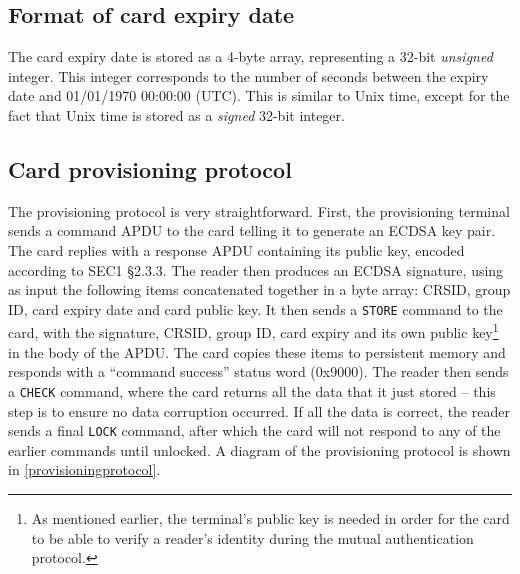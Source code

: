 \documentclass[12pt,a4paper,twoside,openright]{report}
\begin{document}
\subsection{Format of card expiry date}

The card expiry date is stored as a 4-byte array, representing a 32-bit \emph{unsigned} integer. This integer corresponds to the number of seconds between the expiry date and 01/01/1970 00:00:00 (UTC). This is similar to Unix time, except for the fact that Unix time is stored as a \emph{signed} 32-bit integer.

\subsection{Card provisioning protocol}

The provisioning protocol is very straightforward. First, the provisioning terminal sends a command APDU to the card telling it to generate an ECDSA key pair. The card replies with a response APDU containing its public key, encoded according to SEC1 \cite{sec1} \S2.3.3. The reader then produces an ECDSA signature, using as input the following items concatenated together in a byte array: CRSID, group ID, card expiry date and card public key. It then sends a \texttt{STORE} command to the card, with the signature, CRSID, group ID, card expiry and its own public key\footnote{As mentioned earlier, the terminal's public key is needed in order for the card to be able to verify a reader's identity during the mutual authentication protocol.} in the body of the APDU. The card copies these items to persistent memory and responds with a ``command success'' status word (0x9000). The reader then sends a \texttt{CHECK} command, where the card returns all the data that it just stored -- this step is to ensure no data corruption occurred. If all the data is correct, the reader sends a final \texttt{LOCK} command, after which the card will not respond to any of the earlier commands until unlocked. A diagram of the provisioning protocol is shown in \autoref{provisioningprotocol}.
\end{document}
